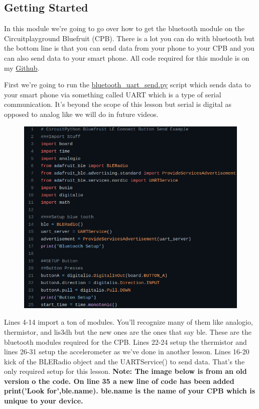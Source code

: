 \subsection{Getting Started}

In this module we're going to go over how to get the bluetooth module on the Circuitplayground Bluefruit (CPB). There is a lot you can do with bluetooth but the bottom line is that you can send data from your phone to your CPB and you can also send data to your smart phone. All code required for this module is on my \href{https://github.com/cmontalvo251/Microcontrollers/tree/master/Circuit_Playground/CircuitPython/CPB_DataLogger}{Github}.

First we're going to run the \href{https://github.com/cmontalvo251/Microcontrollers/blob/master/Circuit_Playground/CircuitPython/CPB_DataLogger/bluefruit_uart_send.py}{bluetooth\_uart\_send.py} script which sends data to your smart phone via something called UART which is a type of serial communication. It's beyond the scope of this lesson but serial is digital as opposed to analog like we will do in future videos. 
\begin{figure}[H]
  \begin{center}
    \includegraphics[width=\textwidth]{Figures/bluetooth_code.png}
  \end{center}
\end{figure}
Lines 4-14 import a ton of modules. You'll recognize many of them like analogio, thermistor, and lis3dh but the new ones are the ones that say ble. These are the bluetooth modules required for the CPB. Lines 22-24 setup the thermistor and lines 26-31 setup the accelerometer as we've done in another lesson. Lines 16-20 kick of the BLERadio object and the UARTService() to send data. That's the only required setup for this lesson. {\bf Note: The image below is from an old version o the code. On line 35 a new line of code has been added print('Look for',ble.name). ble.name is the name of your CPB which is unique to your device.}
